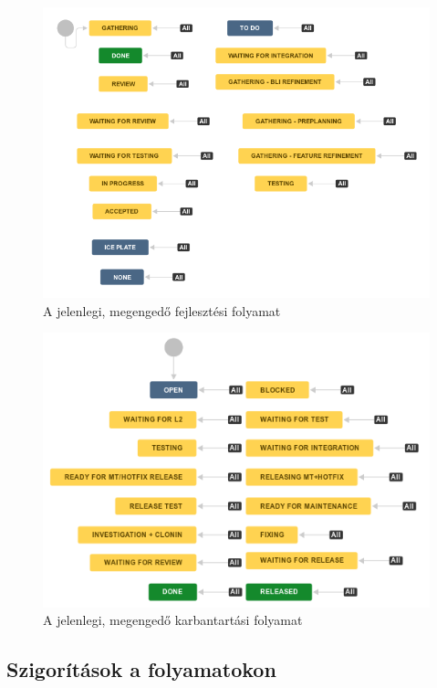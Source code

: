 \begin{figure}[h]
    \centering
    \includegraphics[width=\textwidth, height=0.25\textheight, keepaspectratio]{figures/oldfeature.png}
    \caption{A jelenlegi, megengedő fejlesztési folyamat}
    \label{fig:oldfeature}
\end{figure}
\FloatBarrier
\pagebreak[3]

\begin{figure}[h]
    \includegraphics[width=\textwidth, height=0.25\textheight, keepaspectratio]{figures/oldmt.png}
    \centering
    \caption{A jelenlegi, megengedő karbantartási folyamat}
    \label{fig:oldmt}
\end{figure}

\FloatBarrier
\pagebreak[3]
\subsection{Szigorítások a folyamatokon}

